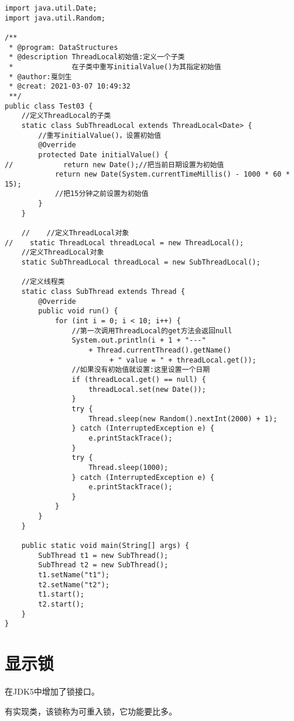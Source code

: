 \documentclass[a4paper]{report}
\begin{document}
\begin{Verbatim}[frame=single,numbersep=5pt,xleftmargin=1.5em,xrightmargin=1.5em]
import java.util.Date;
import java.util.Random;

/**
 * @program: DataStructures
 * @description ThreadLocal初始值:定义一个子类
 *              在子类中重写initialValue()为其指定初始值
 * @author:戛剑生
 * @creat: 2021-03-07 10:49:32
 **/
public class Test03 {
    //定义ThreadLocal的子类
    static class SubThreadLocal extends ThreadLocal<Date> {
        //重写initialValue()，设置初始值
        @Override
        protected Date initialValue() {
//            return new Date();//把当前日期设置为初始值
            return new Date(System.currentTimeMillis() - 1000 * 60 * 15);
            //把15分钟之前设置为初始值
        }
    }

    //    //定义ThreadLocal对象
//    static ThreadLocal threadLocal = new ThreadLocal();
    //定义ThreadLocal对象
    static SubThreadLocal threadLocal = new SubThreadLocal();

    //定义线程类
    static class SubThread extends Thread {
        @Override
        public void run() {
            for (int i = 0; i < 10; i++) {
                //第一次调用ThreadLocal的get方法会返回null
                System.out.println(i + 1 + "---"
                    + Thread.currentThread().getName()
                         + " value = " + threadLocal.get());
                //如果没有初始值就设置:这里设置一个日期
                if (threadLocal.get() == null) {
                    threadLocal.set(new Date());
                }
                try {
                    Thread.sleep(new Random().nextInt(2000) + 1);
                } catch (InterruptedException e) {
                    e.printStackTrace();
                }
                try {
                    Thread.sleep(1000);
                } catch (InterruptedException e) {
                    e.printStackTrace();
                }
            }
        }
    }

    public static void main(String[] args) {
        SubThread t1 = new SubThread();
        SubThread t2 = new SubThread();
        t1.setName("t1");
        t2.setName("t2");
        t1.start();
        t2.start();
    }
}\end{Verbatim}
\chapter{显示锁}
在JDK5中增加了锁接口。

有实现类，该锁称为可重入锁，它功能要比多。
\end{document}

